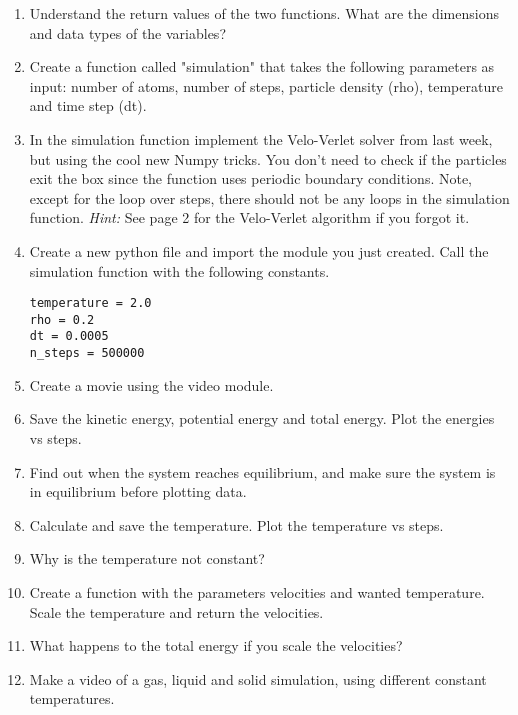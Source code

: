 \documentclass{article}
\begin{document}
\begin{enumerate}[resume]
    \item Understand the return values of the two functions.
        What are the dimensions and data types of the variables?

 
    \item Create a function called "simulation" that takes the following parameters as input:
        number of atoms,
        number of steps,
        particle density (rho),
        temperature and
        time step (dt).


    \item In the simulation function implement the Velo-Verlet solver from last week,
        but using the cool new Numpy tricks.
        You don't need to check if the particles exit the box since the  function uses periodic boundary conditions.
        Note, except for the loop over steps, there should not be any loops in the simulation function.
       {\em Hint:} See page 2 for the Velo-Verlet algorithm if you forgot it.


    \item Create a new python file and import the module you just created. Call the simulation function with the following constants.
\begin{lstlisting}
temperature = 2.0
rho = 0.2
dt = 0.0005
n_steps = 500000
\end{lstlisting}


    \item Create a movie using the video module.

    \item Save the kinetic energy, potential energy and total energy.
        Plot the energies vs steps.

    \item Find out when the system reaches equilibrium, and make sure the system is in equilibrium before plotting data.

    \item Calculate and save the temperature.
        Plot the temperature vs steps.

    \item Why is the temperature not constant?

    \item Create a function  with the parameters velocities and wanted temperature.
        Scale the temperature and return the velocities.
        
    \item What happens to the total energy if you scale the velocities?

    \item Make a video of a gas, liquid and solid simulation, using different constant temperatures.

\end{enumerate}
\end{document}
